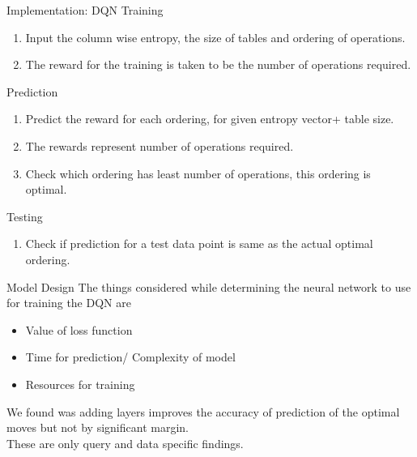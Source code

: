 \begin{frame}{Implementation: DQN}
    Training
    \begin{enumerate}
        \item Input the column wise entropy, the size of tables and ordering of operations.
        \item The reward for the training is taken to be the number of operations required.
    \end{enumerate}
    Prediction
    \begin{enumerate}
        \item Predict the reward for each ordering, for given entropy vector+ table size.\\
        \item The rewards represent number of operations required.
        \item Check which ordering has least number of operations, this ordering is optimal.
    \end{enumerate}
    Testing
    \begin{enumerate}
        \item Check if prediction for a test data point is same as the actual optimal ordering.
    \end{enumerate}
\end{frame}

\begin{frame}{Model Design}
The things considered while determining the neural network to use for training the DQN are
    \begin{itemize}
        \item Value of loss function
        \item Time for prediction/ Complexity of model
        \item Resources for training
    \end{itemize}
    We found was adding layers improves the accuracy of prediction of the optimal moves but not by significant margin.\\
    These are only query and data specific findings.
\end{frame}
